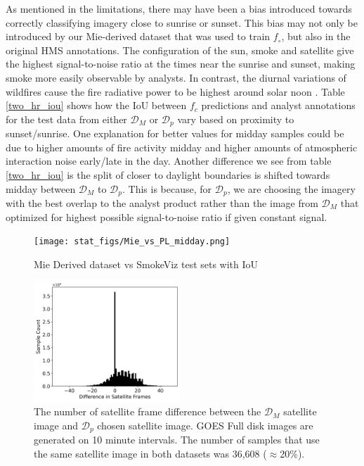 \documentclass{article}
\begin{document}
As mentioned in the limitations, there may have been a bias introduced towards correctly classifying imagery close to sunrise or sunset. This bias may not only be introduced by our Mie-derived dataset that was used to train \(f_{\circ}\), but also in the original HMS annotations. The configuration of the sun, smoke and satellite give the highest signal-to-noise ratio at the times near the sunrise and sunset, making smoke more easily observable by analysts. In contrast, the diurnal variations of wildfires cause the fire radiative power to be highest around solar noon \cite{diurnal}. Table \ref{two_hr_iou} shows how the IoU between \(f_c\) predictions and analyst annotations for the test data from either \(\mathcal{D}_M\) or \(\mathcal{D}_p\) vary based on proximity to sunset/sunrise. One explanation for better values for midday samples could be due to higher amounts of fire activity midday and higher amounts of atmospheric interaction noise early/late in the day. Another difference we see from table \ref{two_hr_iou} is the split of closer to daylight boundaries is shifted towards midday between \(\mathcal{D}_M\) to \(\mathcal{D}_p\). This is because, for \(\mathcal{D}_p\), we are choosing the imagery with the best overlap to the analyst product rather than the image from \(\mathcal{D}_M\) that optimized for highest possible signal-to-noise ratio if given constant signal.

\begin{figure}[!htb]
    \centering
    \texttt{[image: stat\_figs/Mie\_vs\_PL\_midday.png]}
    \caption{Mie Derived dataset vs SmokeViz test sets with IoU}
    \label{DM_vs_DP}
\end{figure}

\begin{figure}[!htb]
    \centering
        \includegraphics[width=0.49\textwidth]{stat_figs/sample_count_vs_diff_frames.png}
        \caption{The number of satellite frame difference between the \(\mathcal{D}_M\) satellite image and \(\mathcal{D}_p\) chosen satellite image. GOES Full disk images are generated on 10 minute intervals. The number of samples that use the same satellite image in both datasets was 36,608 (\(\approx\)20\%).}
        \label{frame_diff}
\end{figure}
\end{document}
